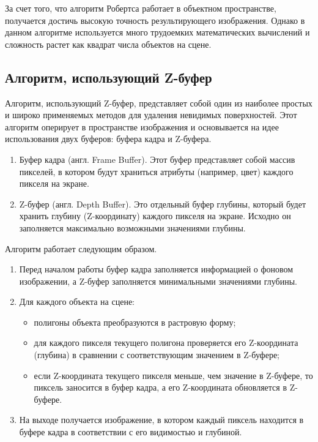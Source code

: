 За счет того, что алгоритм Робертса работает в объектном пространстве, получается достичь высокую точность результирующего изображения. 
Однако в данном алгоритме используется много трудоемких математических вычислений и сложность растет как квадрат числа объектов на сцене.

\subsection{Алгоритм, использующий Z-буфер}

Алгоритм, использующий Z-буфер, представляет собой один из наиболее простых и широко применяемых методов для удаления невидимых поверхностей. Этот алгоритм оперирует в пространстве изображения и основывается на идее использования двух буферов: буфера кадра и Z-буфера.

\begin{enumerate}
    \item Буфер кадра (англ. Frame Buffer). 
    Этот буфер представляет собой массив пикселей, в котором будут храниться атрибуты (например, цвет) каждого пикселя на экране.
    \item Z-буфер (англ. Depth Buffer). 
    Это отдельный буфер глубины, который будет хранить глубину (Z-координату) каждого пикселя на экране. 
    Исходно он заполняется максимально возможными значениями глубины.
\end{enumerate}

Алгоритм работает следующим образом.
\begin{enumerate}
    \item Перед началом работы буфер кадра заполняется информацией о фоновом изображении, а Z-буфер заполняется минимальными значениями глубины.
    \item Для каждого объекта на сцене: 
    \begin{itemize}
        \item полигоны объекта преобразуются в растровую форму;
        \item для каждого пикселя текущего полигона проверяется его Z-координата (глубина) в сравнении с соответствующим значением в Z-буфере;
        \item если Z-координата текущего пикселя меньше, чем значение в Z-буфере, то пиксель заносится в буфер кадра, а его Z-координата обновляется в Z-буфере.
    \end{itemize}
    \item На выходе получается изображение, в котором каждый пиксель находится в буфере кадра в соответствии с его видимостью и глубиной.
\end{enumerate}

